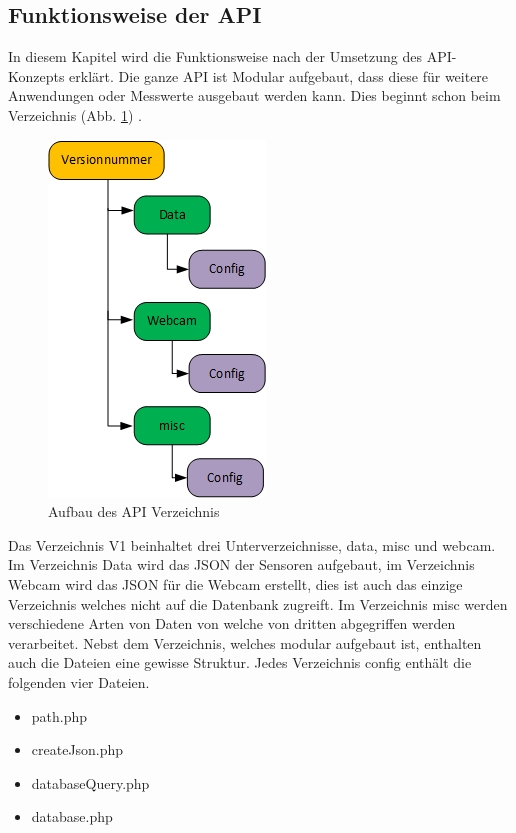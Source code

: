 \subsection{Funktionsweise der API}

In diesem Kapitel wird die Funktionsweise nach der Umsetzung des API-Konzepts erklärt. Die ganze API ist Modular aufgebaut, dass diese für weitere Anwendungen oder Messwerte ausgebaut werden kann. Dies beginnt schon beim Verzeichnis (Abb. \ref{img:APIVerzeichnis}) .


\begin{figure}[h!]
	\centering
	\includegraphics[width=0.3\linewidth]{img/APIVerzeichnis.jpg}
	\caption{Aufbau des API Verzeichnis}
	\label{img:APIVerzeichnis}
\end{figure}

Das Verzeichnis V1 beinhaltet drei Unterverzeichnisse, data, misc und webcam. Im Verzeichnis Data wird das JSON der Sensoren aufgebaut, im Verzeichnis Webcam wird das JSON für die Webcam erstellt, dies ist auch das einzige Verzeichnis welches nicht auf die Datenbank zugreift. Im Verzeichnis misc werden verschiedene Arten von Daten von welche von dritten abgegriffen werden verarbeitet. Nebst dem Verzeichnis, welches modular aufgebaut ist, enthalten auch die Dateien eine gewisse Struktur. Jedes Verzeichnis config enthält die folgenden vier Dateien. 
\begin{itemize}
\item path.php
\item createJson.php
\item databaseQuery.php
\item database.php
\end{itemize}

